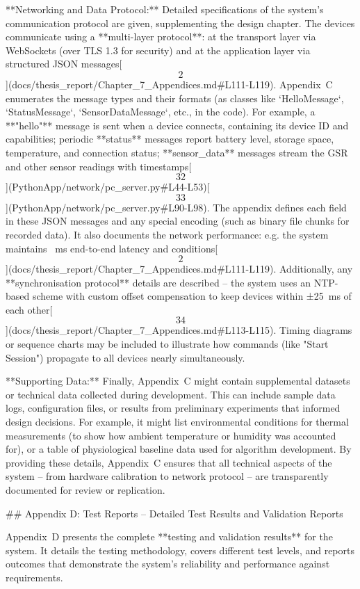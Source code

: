 \documentclass[12pt,a4paper]{article}
\begin{document}
{**Networking and Data Protocol:** Detailed specifications of the
system's communication protocol are given, supplementing the design
chapter. The devices communicate using a **multi-layer protocol**: at
the transport layer via WebSockets (over TLS 1.3 for security) and at
the application layer via structured JSON
messages[\[2\]](docs/thesis_report/Chapter_7_Appendices.md#L111-L119).
Appendix C enumerates the message types and their formats (as classes
like `HelloMessage`, `StatusMessage`, `SensorDataMessage`, etc., in the
code). For example, a **"hello"** message is sent when a device
connects, containing its device ID and capabilities; periodic **status**
messages report battery level, storage space, temperature, and
connection status; **sensor_data** messages stream the GSR and other
sensor readings with
timestamps[\[32\]](PythonApp/network/pc_server.py#L44-L53)[\[33\]](PythonApp/network/pc_server.py#L90-L98).
The appendix defines each field in these JSON messages and any special
encoding (such as binary file chunks for recorded data). It also
documents the network performance: e.g. the system maintains  ms
end-to-end latency and %
conditions[\[2\]](docs/thesis_report/Chapter_7_Appendices.md#L111-L119).
Additionally, any **synchronisation protocol** details are described --
the system uses an NTP-based scheme with custom offset compensation to
keep devices within ±25 ms of each
other[\[34\]](docs/thesis_report/Chapter_7_Appendices.md#L113-L115).
Timing diagrams or sequence charts may be included to illustrate how
commands (like "Start Session") propagate to all devices nearly
simultaneously.

**Supporting Data:** Finally, Appendix C might contain supplemental
datasets or technical data collected during development. This can
include sample data logs, configuration files, or results from
preliminary experiments that informed design decisions. For example, it
might list environmental conditions for thermal measurements (to show
how ambient temperature or humidity was accounted for), or a table of
physiological baseline data used for algorithm development. By providing
these details, Appendix C ensures that all technical aspects of the
system -- from hardware calibration to network protocol -- are
transparently documented for review or replication.

## Appendix D: Test Reports -- Detailed Test Results and Validation Reports

Appendix D presents the complete **testing and validation results**
for the system. It details the testing methodology, covers different
test levels, and reports outcomes that demonstrate the system's
reliability and performance against requirements.

}
\end{document}
